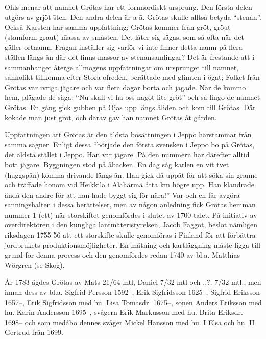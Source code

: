 
%

Ohls menar att namnet Grötas har ett fornnordiskt ursprung. Den första delen utgörs av grjöt \= sten. Den andra delen är a \= å. Grötas skulle alltså betyda ``stenån''. Också Karsten har samma uppfattning; Grötas kommer från gröt, gröut (stamform graut) \= massa av småsten. Det låter sig sägas, som så ofta när det gäller ortnamn. Frågan inställer sig varför vi inte finner detta namn på flera ställen längs ån där det finns massor av stenansamlingar? Det är frestande att i sammanhanget återge allmogens uppfattningar om ursprunget till namnet, sannolikt tillkomna efter Stora ofreden, berättade med glimten i ögat;
 Folket från Grötas var ivriga jägare och var flera dagar borta och jagade. När de kommo hem, plägade de säga: ``Nu skall vi ha oss något lite gröt'' och så fingo de namnet Grötas.
 En gång gick gubben på Ojas upp längs åliden och kom till Grötas. Där kokade man just gröt, och därav gav han namnet Grötas åt gården.

Uppfattningen att Grötas är den äldsta bosättningen i Jeppo härstammar från samma sägner. Enligt dessa ``började den första svensken i Jeppo bo på Grötas, det äldsta stället i Jeppo. Han var jägare. På den nummern har därefter alltid bott jägare. Byggningen stod på åbacken. En dag såg karlen en vit tvet (huggspån) komma drivande längs ån. Han gick då uppåt för att söka sin granne och träffade honom vid Heikkilä i Alahärmä åtta km högre upp. Han klandrade ändå den andre för att han hade byggt sig för nära!'' Var och en får avgöra sanningshalten i dessa berättelser, men av någon anledning fick Grötas hemman nummer 1 (ett) när storskiftet genomfördes i slutet av 1700-talet. På initiativ av överdirektören i den kungliga lantmäteristyrelsen, Jacob Faggot, beslöt nämligen riksdagen 1755-56 att ett storskifte skulle genomföras i Finland för att förbättra jordbrukets produktionsmöjligheter. En mätning och kartläggning måste ligga till grund för denna process och den genomfördes redan 1740 av bl.a. Matthias Wörgren (se Skog).

År 1783 ägdes Grötas av Mats 21/64 mtl, Daniel 7/32 mtl och  ..?. 7/32 mtl., men innan dess av bl.a. Sigfrid Persson 1592--, Erik Sigfridsson 1625--, Sigfrid Eriksson  1657--, Erik Sigfridsson med hu. Lisa Tomasdr. 1675--, sonen  Anders Eriksson med hu. Karin Andersson 1695--, svågern Erik Markusson med hu. Brita Eriksdr. 1698-- och som medåbo dennes svåger Mickel Hansson med hu. I Elsa och hu. II Gertrud från 1699.

